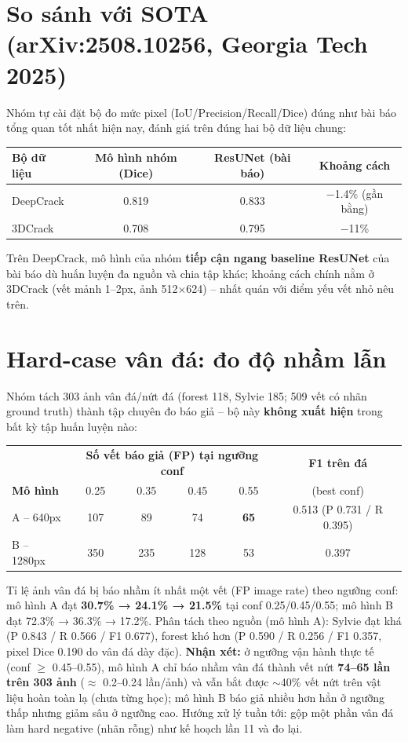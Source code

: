 \documentclass[12pt,a4paper]{article}
\begin{document}
\section{So sánh với SOTA (arXiv:2508.10256, Georgia Tech 2025)}
Nhóm tự cài đặt bộ đo mức pixel (IoU/Precision/Recall/Dice) đúng như bài báo tổng quan tốt nhất hiện nay, đánh giá trên đúng hai bộ dữ liệu chung:
\begin{table}[H]
\centering
\begin{tabular}{lccc}
\toprule
\textbf{Bộ dữ liệu} & \textbf{Mô hình nhóm (Dice)} & \textbf{ResUNet (bài báo)} & \textbf{Khoảng cách} \\
\midrule
DeepCrack & 0.819 & 0.833 & $-$1.4\% (gần bằng) \\
3DCrack & 0.708 & 0.795 & $-$11\% \\
\bottomrule
\end{tabular}
\end{table}
Trên DeepCrack, mô hình của nhóm \textbf{tiếp cận ngang baseline ResUNet} của bài báo dù huấn luyện đa nguồn và chia tập khác; khoảng cách chính nằm ở 3DCrack (vết mảnh 1--2px, ảnh 512$\times$624) -- nhất quán với điểm yếu vết nhỏ nêu trên.

\section{Hard-case vân đá: đo độ nhầm lẫn}
Nhóm tách 303 ảnh vân đá/nứt đá (forest 118, Sylvie 185; 509 vết có nhãn ground truth) thành tập chuyên đo báo giả -- bộ này \textbf{không xuất hiện} trong bất kỳ tập huấn luyện nào:
\begin{table}[H]
\centering
\small
\begin{tabular}{lccccc}
\toprule
 & \multicolumn{4}{c}{\textbf{Số vết báo giả (FP) tại ngưỡng conf}} & \textbf{F1 trên đá} \\
\textbf{Mô hình} & 0.25 & 0.35 & 0.45 & 0.55 & (best conf) \\
\midrule
A -- 640px & 107 & 89 & 74 & \textbf{65} & 0.513 (P 0.731 / R 0.395) \\
B -- 1280px & 350 & 235 & 128 & 53 & 0.397 \\
\bottomrule
\end{tabular}
\end{table}
Tỉ lệ ảnh vân đá bị báo nhầm ít nhất một vết (FP image rate) theo ngưỡng conf: mô hình A đạt \textbf{30.7\% → 24.1\% → 21.5\%} tại conf 0.25/0.45/0.55; mô hình B đạt 72.3\% → 36.3\% → 17.2\%. Phân tách theo nguồn (mô hình A): Sylvie đạt khá (P 0.843 / R 0.566 / F1 0.677), forest khó hơn (P 0.590 / R 0.256 / F1 0.357, pixel Dice 0.190 do vân đá dày đặc).
\textbf{Nhận xét:} ở ngưỡng vận hành thực tế (conf $\geq$ 0.45--0.55), mô hình A chỉ báo nhầm vân đá thành vết nứt \textbf{74--65 lần trên 303 ảnh} ($\approx$ 0.2--0.24 lần/ảnh) và vẫn bắt được $\sim$40\% vết nứt trên vật liệu hoàn toàn lạ (chưa từng học); mô hình B báo giả nhiều hơn hẳn ở ngưỡng thấp nhưng giảm sâu ở ngưỡng cao. Hướng xử lý tuần tới: gộp một phần vân đá làm hard negative (nhãn rỗng) như kế hoạch lần 11 và đo lại.
\end{document}
